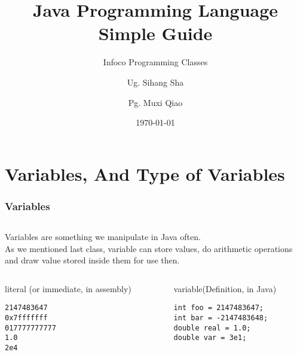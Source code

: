 \documentclass[en, 11pt, xcolor=dvipsnames]{beamer}
\title{Java Programming Language \\ Simple Guide} %
\subtitle{Infoco Programming Classes} %
\author{Ug. Sihang Sha \and Pg. Muxi Qiao} %
\institute{Xiann' Jiaotong Livepool University \\ \smallskip \textit{infoco@xjtlu.edu.cn}} %
\date{\today} %
\begin{document}
\maketitle



\section{Variables, And Type of Variables}
\begin{frame}[fragile]
	\frametitle{Variables}


	\begin{columns}[c]
		\begin{column}{0.9\textwidth}

			Variables are something we manipulate in Java often.\\

			As we mentioned last class, variable can store values, do arithmetic operations and draw value stored inside them for use then.

			\begin{columns}[c]
				\begin{column}{0.4\textwidth}

					{\footnotesize
						literal (or immediate, in assembly)
					}

					\begin{lstlisting}
2147483647
0x7fffffff
017777777777
1.0
2e4\end{lstlisting}

				\end{column}

				\begin{column}{0.4\textwidth}

					{\footnotesize
						variable(Definition, in Java)
					}

					\begin{lstlisting}
int foo = 2147483647;
int bar = -2147483648;
double real = 1.0;
double var = 3e1;\end{lstlisting}

				\end{column}
			\end{columns}

		\end{column}
	\end{columns}

\end{frame}
\end{document}
